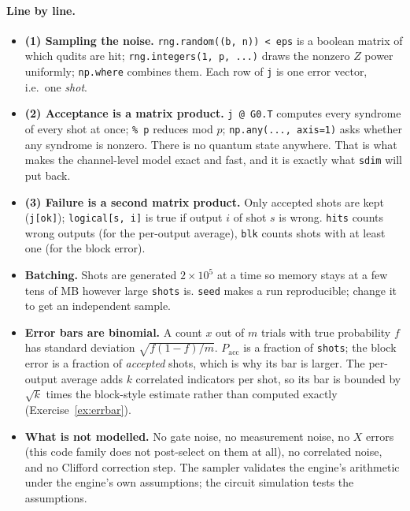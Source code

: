 \documentclass[11pt]{article}
\newcommand{\code}[1]{\texttt{#1}}
\begin{document}
\paragraph{Line by line.}
\begin{itemize}[nosep]
\item \textbf{(1) Sampling the noise.} \code{rng.random((b, n)) < eps} is a boolean
  matrix of which qudits are hit; \code{rng.integers(1, p, ...)} draws the nonzero
  $Z$ power uniformly; \code{np.where} combines them. Each row of \code{j} is one
  error vector, i.e.\ one \emph{shot}.
\item \textbf{(2) Acceptance is a matrix product.} \code{j @ G0.T} computes every
  syndrome of every shot at once; \code{\% p} reduces mod $p$; \code{np.any(..., axis=1)}
  asks whether any syndrome is nonzero. There is no quantum state anywhere. That is
  what makes the channel-level model exact and fast, and it is exactly what
  \code{sdim} will put back.
\item \textbf{(3) Failure is a second matrix product.} Only accepted shots are kept
  (\code{j[ok]}); \code{logical[s, i]} is true if output $i$ of shot $s$ is wrong.
  \code{hits} counts wrong outputs (for the per-output average), \code{blk} counts
  shots with at least one (for the block error).
\item \textbf{Batching.} Shots are generated $2\times10^{5}$ at a time so memory stays
  at a few tens of MB however large \code{shots} is. \code{seed} makes a run
  reproducible; change it to get an independent sample.
\item \textbf{Error bars are binomial.} A count $x$ out of $m$ trials with true
  probability $f$ has standard deviation $\sqrt{f(1-f)/m}$. $P_{\mathrm{acc}}$ is a
  fraction of \code{shots}; the block error is a fraction of \emph{accepted} shots,
  which is why its bar is larger. The per-output average adds $k$ correlated
  indicators per shot, so its bar is bounded by $\sqrt{k}$ times the block-style
  estimate rather than computed exactly (Exercise~\ref{ex:errbar}).
\item \textbf{What is not modelled.} No gate noise, no measurement noise, no $X$
  errors (this code family does not post-select on them at all), no correlated
  noise, and no Clifford correction step. The sampler validates the engine's
  arithmetic under the engine's own assumptions; the circuit simulation tests the
  assumptions.
\end{itemize}
\end{document}
